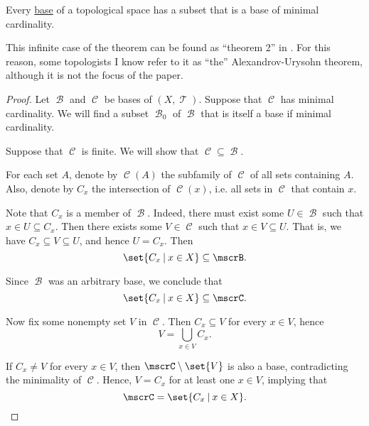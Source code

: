 \begin{proposition}\label{thm:base_has_subset_of_minimal_weight}
  Every \hyperref[def:topological_base]{base} of a topological space has a subset that is a base of minimal cardinality.
\end{proposition}
\begin{thmcomment}
  This infinite case of the theorem can be found as \enquote{theorem 2} in \cite{АлександровУрысон1950}. For this reason, some topologists I know refer to it as \enquote{the} Alexandrov-Urysohn theorem, although it is not the focus of the paper.
\end{thmcomment}
\begin{proof}
  Let \( \mscrB \) and \( \mscrC \) be bases of \( (X, \mscrT) \). Suppose that \( \mscrC \) has minimal cardinality. We will find a subset \( \mscrB_0 \) of \( \mscrB \) that is itself a base if minimal cardinality.

   Suppose that \( \mscrC \) is finite. We will show that \( \mscrC \subseteq \mscrB \).

  For each set \( A \), denote by \( \mscrC(A) \) the subfamily of \( \mscrC \) of all sets containing \( A \). Also, denote by \( C_x \) the intersection of \( \mscrC(x) \), i.e. all sets in \( \mscrC \) that contain \( x \).

  Note that \( C_x \) is a member of \( \mscrB \). Indeed, there must exist some \( U \in \mscrB \) such that \( x \in U \subseteq C_x \). Then there exists some \( V \in \mscrC \) such that \( x \in V \subseteq U \). That is, we have \( C_x \subseteq V \subseteq U \), and hence \( U = C_x \). Then
  \begin{equation*}
    \set{ C_x \given x \in X } \subseteq \mscrB.
  \end{equation*}

  Since \( \mscrB \) was an arbitrary base, we conclude that
  \begin{equation*}
    \set{ C_x \given x \in X } \subseteq \mscrC.
  \end{equation*}

  Now fix some nonempty set \( V \) in \( \mscrC \). Then \( C_x \subseteq V \) for every \( x \in V \), hence
  \begin{equation*}
    V = \bigcup_{x \in V} C_x.
  \end{equation*}

  If \( C_x \neq V \) for every \( x \in V \), then \( \mscrC \setminus \set{ V } \) is also a base, contradicting the minimality of \( \mscrC \). Hence, \( V = C_x \) for at least one \( x \in V \), implying that
  \begin{equation*}
    \mscrC = \set{ C_x \given x \in X }.
  \end{equation*}


\end{proof}
